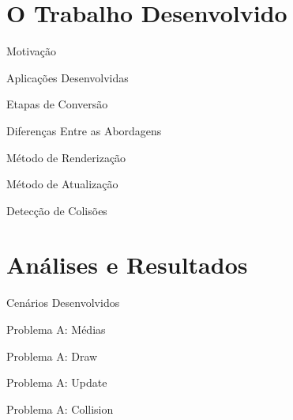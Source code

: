 \documentclass{beamer}
\begin{document}
\section{O Trabalho Desenvolvido}

\frame{\tableofcontents[currentsection]}

\begin{frame}[t]{Motivação}
\end{frame}

\begin{frame}[t]{Aplicações Desenvolvidas}
\end{frame}

\begin{frame}[t]{Etapas de Conversão}
\end{frame}

\begin{frame}[t]{Diferenças Entre as Abordagens}
\end{frame}

\begin{frame}[t]{Método de Renderização}
\end{frame}

\begin{frame}[t]{Método de Atualização}
\end{frame}

\begin{frame}[t]{Detecção de Colisões}
\end{frame}

\section{Análises e Resultados}

\frame{\tableofcontents[currentsection]}

\begin{frame}[t]{Cenários Desenvolvidos}
\end{frame}

\begin{frame}[t]{Problema A: Médias}
\end{frame}

\begin{frame}[t]{Problema A: Draw}
\end{frame}

\begin{frame}[t]{Problema A: Update}
\end{frame}

\begin{frame}[t]{Problema A: Collision}
\end{frame}
\end{document}
